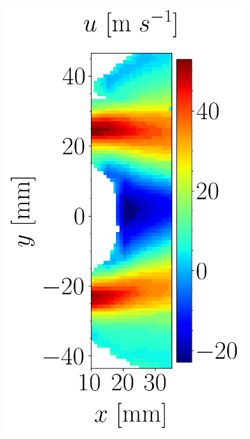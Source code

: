 \begin{figure}[h!]
\hspace*{0.1in}
\begin{subfigure}[b]{0.3\textwidth}
	\centering
   \includegraphics[scale=0.4]{./part3_applications/figures_ch9_lagrangian/expe_maps/u_axial_map.png}
\end{subfigure}
\hspace*{0.1in}
\begin{subfigure}[b]{0.3\textwidth}

\end{subfigure}
\end{figure}
